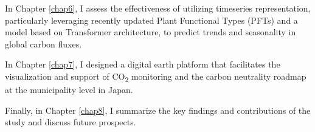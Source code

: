 In Chapter \ref{chap6}, I assess the effectiveness of utilizing timeseries representation, particularly leveraging recently updated Plant Functional Types (PFTs) and a model based on Transformer architecture, to predict trends and seasonality in global carbon fluxes. \par

In Chapter \ref{chap7}, I designed a digital earth platform that facilitates the visualization and support of CO\textsubscript{2} monitoring and the carbon neutrality roadmap at the municipality level in Japan. \par

Finally, in Chapter \ref{chap8}, I summarize the key findings and contributions of the study and discuss future prospects.\par